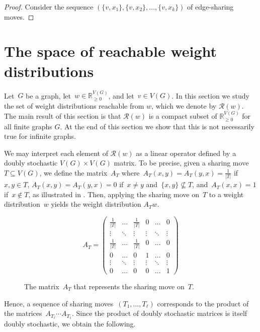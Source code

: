 \documentclass[reqno, 12pt]{amsart}
\numberwithin{equation}{section}
\numberwithin{figure}{section}
\theoremstyle{plain}
\theoremstyle{definition}
\newcommand*{\abs}[1]{\ensuremath{{\left\lvert {#1} \right\rvert}}}
\newcommand*{\weights}{\ensuremath{\mathbb{R}_{\geq 0}^{V(G)}}}
\begin{document}
\begin{proof}
    Consider the sequence ${(\{v,x_{1}\}, \{v,x_{2}\}, \dots, \{v,x_{k}\})}$ of edge-sharing moves. 
\end{proof}


\section{The space of reachable weight distributions}
\label{sec:reachable}

Let~$G$ be a graph, let~${w \in \weights}$, and let~${v \in V(G)}$. In this section we study the set of weight distributions reachable from $w$, which we denote by $\mathcal{R}(w)$. The main result of this section is that $\mathcal{R}(w)$ is a compact 
subset of $\weights$ for all finite graphs $G$. At the end of this section we show that this is not necessarily true for infinite graphs.  

We may interpret each element of $\mathcal{R}(w)$ as a  linear operator defined by a doubly stochastic $V(G) \times V(G)$ matrix. To be precise,
given a sharing move~$T \subseteq V(G)$, we define the matrix~$A_T$ where~${A_T(x,y) = A_T(y,x) = \frac{1}{\abs{T}}}$ if~${x,y \in T}$, ${A_T(x,y) = A_T(y,x) = 0}$ if~${x \neq y}$ and~${\{x,y\} \not\subseteq T}$, and~${A_T(x,x) = 1}$ if~${x \notin T}$, as illustrated in .  
Then, applying the sharing move on~$T$ to a weight distribution~$w$ yields the weight distribution $A_Tw$.

\begin{figure}[htbp]
    \centering
    \[
    A_T = 
    \begin{pmatrix}
        \frac{1}{\abs{T}} & \dots & \frac{1}{\abs{T}} & 0 & \dots & 0\\
        \vdots & \ddots & \vdots & \vdots & \ddots & \vdots\\
        \frac{1}{\abs{T}} & \dots & \frac{1}{\abs{T}} & 0 & \dots & 0\\
        0 & \dots & 0 & 1 & \dots & 0\\
        \vdots & \ddots & \vdots & \vdots & \ddots & \vdots \\
        0 & \dots & 0 & 0 & \dots & 1
    \end{pmatrix}
    \]
    \caption{The matrix~$A_T$ that represents the sharing move on~$T$. }
    \label{fig:matrix}
\end{figure}

Hence, a sequence of sharing moves~$(T_1, \dots, T_\ell)$ corresponds to the product of the matrices~${A_{T_\ell}  \cdots  A_{T_1}}$. Since the product of doubly stochastic matrices is itself doubly stochastic, we obtain the following. 
\end{document}
